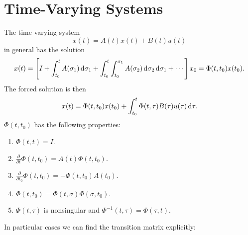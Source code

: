 \documentclass{report}
\begin{document}
\section{Time-Varying Systems}
The time varying system
$$
\dot{x}(t) = A(t) x(t) + B(t) u(t)
$$
in general has the solution
$$
x(t) =
\left[
  I
+ \int_{t_0}^{t} A(\sigma_1) \dif\sigma_1
+ \int_{t_0}^t \int_{t_0}^{\sigma_1} A(\sigma_2) \dif\sigma_2
\dif\sigma_1
+ \cdots
\right]
x_0 =
\Phi(t, t_0) x(t_0).
$$
The forced solution is then
$$
x(t) = \Phi(t, t_0) x(t_0)
     + \int_{t_0}^t \Phi(t, \tau) B(\tau) u(\tau) \dif\tau.
$$
$\Phi(t, t_0)$ has the following properties:
\begin{enumerate}
  \item{
    $\Phi(t, t) = I$.
  }
  \item{
    $\frac{\partial}{\partial t} \Phi(t, t_0) = A(t) \Phi(t, t_0)$.
  }
  \item{
    $\frac{\partial}{\partial t_0} \Phi(t, t_0) = -\Phi(t, t_0) A(t_0)$.
  }
  \item{
    $\Phi(t, t_0) = \Phi(t, \sigma) \Phi(\sigma, t_0)$.
  }
  \item{
    $\Phi(t, \tau)$ is nonsingular and
    $\Phi^{-1}(t, \tau) = \Phi(\tau, t)$.
  }
\end{enumerate}
In particular cases we can find the transition matrix explicitly:
\end{document}
